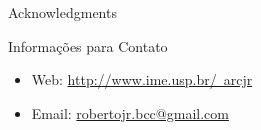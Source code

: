\documentclass[final,hyperref={pdfpagelabels=false}]{beamer}
\begin{document}
\begin{frame}[t]
\begin{columns}[t]
\begin{column}{.465\textwidth}
\begin{block}{Acknowledgments}
\end{block}



\begin{block}{Informações para Contato}

\begin{itemize}
\item Web: \href{http://www.ime.usp.br/~arcjr}{http://www.ime.usp.br/~arcjr}
\item Email: \href{mailto:john@smith.com}{robertojr.bcc@gmail.com}
\end{itemize}

\end{block}


\end{column} %

\begin{column}{.015\textwidth}\end{column} %

\end{columns} %

\end{frame} %
\end{document}
